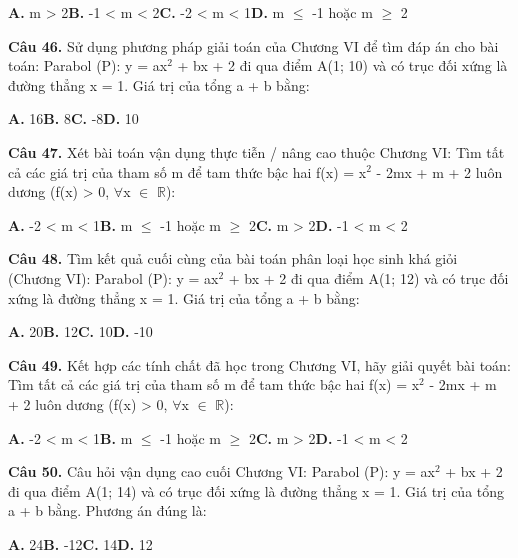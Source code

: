 \documentclass[11pt,a4paper]{article}
\begin{document}
\hspace*{1.5em}\textbf{A.} m > 2\quad\quad \textbf{B.} -1 < m < 2\quad\quad \textbf{C.} -2 < m < 1\quad\quad \textbf{D.} m $\le$ -1 hoặc m $\ge$ 2\par\vspace{2pt}
\textbf{\color{primary} Câu 46.} Sử dụng phương pháp giải toán của Chương VI để tìm đáp án cho bài toán: Parabol (P): y = ax$^2$ + bx + 2 đi qua điểm A(1; 10) và có trục đối xứng là đường thẳng x = 1. Giá trị của tổng a + b bằng:\par
\hspace*{1.5em}\textbf{A.} 16\quad\quad \textbf{B.} 8\quad\quad \textbf{C.} -8\quad\quad \textbf{D.} 10\par\vspace{2pt}
\textbf{\color{primary} Câu 47.} Xét bài toán vận dụng thực tiễn / nâng cao thuộc Chương VI: Tìm tất cả các giá trị của tham số m để tam thức bậc hai f(x) = x$^2$ - 2mx + m + 2 luôn dương (f(x) > 0, $\forall$x $\in$ $\mathbb{R}$):\par
\hspace*{1.5em}\textbf{A.} -2 < m < 1\quad\quad \textbf{B.} m $\le$ -1 hoặc m $\ge$ 2\quad\quad \textbf{C.} m > 2\quad\quad \textbf{D.} -1 < m < 2\par\vspace{2pt}
\textbf{\color{primary} Câu 48.} Tìm kết quả cuối cùng của bài toán phân loại học sinh khá giỏi (Chương VI): Parabol (P): y = ax$^2$ + bx + 2 đi qua điểm A(1; 12) và có trục đối xứng là đường thẳng x = 1. Giá trị của tổng a + b bằng:\par
\hspace*{1.5em}\textbf{A.} 20\quad\quad \textbf{B.} 12\quad\quad \textbf{C.} 10\quad\quad \textbf{D.} -10\par\vspace{2pt}
\textbf{\color{primary} Câu 49.} Kết hợp các tính chất đã học trong Chương VI, hãy giải quyết bài toán: Tìm tất cả các giá trị của tham số m để tam thức bậc hai f(x) = x$^2$ - 2mx + m + 2 luôn dương (f(x) > 0, $\forall$x $\in$ $\mathbb{R}$):\par
\hspace*{1.5em}\textbf{A.} -2 < m < 1\quad\quad \textbf{B.} m $\le$ -1 hoặc m $\ge$ 2\quad\quad \textbf{C.} m > 2\quad\quad \textbf{D.} -1 < m < 2\par\vspace{2pt}
\textbf{\color{primary} Câu 50.} Câu hỏi vận dụng cao cuối Chương VI: Parabol (P): y = ax$^2$ + bx + 2 đi qua điểm A(1; 14) và có trục đối xứng là đường thẳng x = 1. Giá trị của tổng a + b bằng. Phương án đúng là:\par
\hspace*{1.5em}\textbf{A.} 24\quad\quad \textbf{B.} -12\quad\quad \textbf{C.} 14\quad\quad \textbf{D.} 12\par\vspace{2pt}
\end{document}
